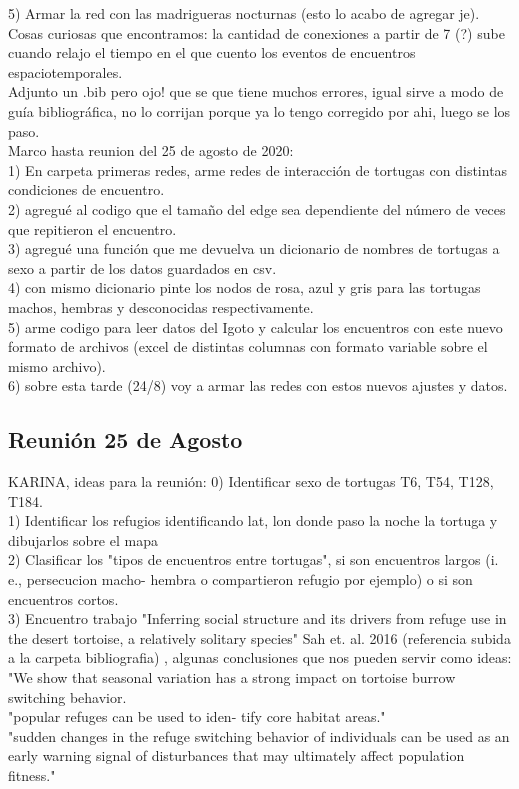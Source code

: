 \documentclass[12pt,screen,twoside,pagebackref]{ibtesis}
\begin{document}
5) Armar la red con las madrigueras nocturnas (esto lo acabo de agregar je).\\

Cosas curiosas que encontramos: la cantidad de conexiones a partir de 7 (?) sube cuando relajo el tiempo en el que cuento los eventos de encuentros espaciotemporales.\\
Adjunto un .bib pero ojo! que se que tiene muchos errores, igual sirve a modo de guía bibliográfica, no lo corrijan porque ya lo tengo corregido por ahi, luego se los paso.\\

Marco hasta reunion del 25 de agosto de 2020: \\
1) En carpeta primeras redes, arme redes de interacción de tortugas con distintas condiciones de encuentro.\\
2) agregué al codigo que el tamaño del edge sea dependiente del número de veces que  repitieron el encuentro.\\
3) agregué una función que me devuelva un dicionario de nombres de tortugas a sexo a partir de los datos guardados en csv.\\ 
4) con mismo dicionario pinte los nodos de rosa, azul y gris  para las tortugas machos, hembras y desconocidas respectivamente.\\ 
5) arme codigo para leer datos del Igoto y calcular los encuentros con este nuevo formato de archivos (excel de distintas columnas con formato variable sobre el mismo archivo).\\
6) sobre esta tarde (24/8) voy a armar las redes con estos nuevos ajustes y datos. 

\subsection*{Reunión 25 de Agosto}

KARINA, ideas para la reunión: 
0) Identificar sexo de tortugas T6, T54, T128, T184.\\
1) Identificar los refugios identificando lat, lon donde paso la noche la tortuga y dibujarlos sobre el mapa\\
2) Clasificar los "tipos de encuentros entre tortugas", si son encuentros largos (i. e., persecucion macho-
hembra o compartieron refugio por ejemplo) o si son encuentros cortos.\\ 
3) Encuentro trabajo "Inferring social structure and its drivers from refuge
use in the desert tortoise, a relatively solitary species" Sah et. al. 2016 (referencia subida a la carpeta bibliografia)
, algunas conclusiones que nos pueden servir como ideas:\\
"We show that seasonal variation has a strong impact on
tortoise burrow switching behavior.\\
"popular refuges can be used to iden-
tify core habitat areas."\\
"sudden changes in the
refuge switching behavior of individuals can be used as an
early warning signal of disturbances that may ultimately
affect population fitness."\\
\end{document}
